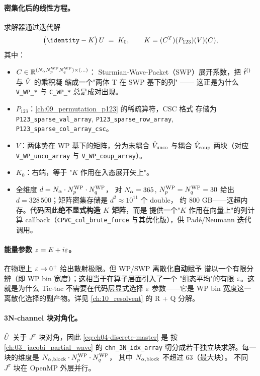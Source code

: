 \paragraph{密集化后的线性方程。}
求解器通过迭代解
\begin{equation}
\label{eq:ch04-discrete-master}
\big( \identity - K \big)\,U \;=\; K_0,
\qquad K = (C^T) (P_{123}) (V) (C),
\end{equation}
其中：
\begin{itemize}
  \item \(C \in \mathbb{R}^{(N_\alpha N_p^{\rm WP} N_q^{\rm WP}) \times (\ldots)}\)：
        Sturmian-Wave-Packet（SWP）展开系数，把 \(\hat{t}^{()}\) 与 \(\hat{V}\) 的乘积凝
        缩成一个"两体 T 在 SWP 基下的列" —— 这正是为什么 \texttt{V\_WP\_*}
        与 \texttt{C\_WP\_*} 总是成对出现。
  \item \(P_{123}\)：\cref{ch:09_permutation_p123} 的稀疏算符，CSC 格式
        存储为 \texttt{P123\_sparse\_val\_array}, \texttt{P123\_sparse\_row\_array},
        \texttt{P123\_sparse\_col\_array\_csc}。
  \item \(V\)：两体势在 WP 基下的矩阵，分为未耦合 \(\hat{V}_{\rm unco}\)
        与耦合 \(\hat{V}_{\rm coup}\) 两块（对应 \texttt{V\_WP\_unco\_array} 与
        \texttt{V\_WP\_coup\_array}）。
  \item \(K_0\)：右端，等于 "\(K\) 作用在入态展开矢上"。
  \item 全维度 \(d = N_\alpha \cdot N_p^{\rm WP} \cdot N_q^{\rm WP}\)，
        对 \(N_\alpha = 365\), \(N_p^{\rm WP} = N_q^{\rm WP} = 30\) 给出
        \(d = 328\,500\)；矩阵密集存储是 \(d^2 \approx 10^{11}\) 个 double，
        约 800 GB——远超内存。代码因此\textbf{绝不显式构造 \(K\) 矩阵}，而是
        提供一个"\(K\) 作用在向量上"的列计算 callback（\texttt{CPVC\_col\_brute\_force}
        与其优化版），供 Padé/Neumann 迭代调用。
\end{itemize}

\paragraph{能量参数 \(z = E + i\varepsilon\)。}
在物理上 \(\varepsilon \to 0^+\) 给出散射极限。但 WP/SWP 离散化\textbf{自动}赋予
谱以一个有限分辨（即 WP bin 宽度）；这相当于在算子层面引入了一个
"组态平均"的有限 \(\varepsilon\)。这就是为什么 Tic-tac 不需要在代码层显式选择
\(\varepsilon\) 参数——它是 WP bin 宽度这一离散化选择的副产物。详见
\cref{ch:10_resolvent} 的 R + Q 分解。

\paragraph{3N-channel 块对角化。}
\(\hat{U}\) 关于 \(J^\pi\) 块对角，因此 \cref{eq:ch04-discrete-master} 是
按 \cref{ch:03_jacobi_partial_wave} 的 \texttt{chn\_3N\_idx\_array}
切分成若干独立块求解。每一块的维度是
\(N_{\alpha,\rm block} \cdot N_p^{\rm WP} \cdot N_q^{\rm WP}\)，
其中 \(N_{\alpha,\rm block}\) 不超过 63（最大块）。
不同 \(J^\pi\) 块在 OpenMP 外层并行。

